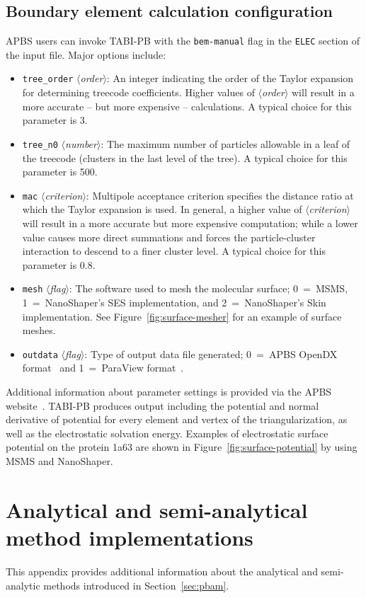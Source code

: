 \documentclass[12pt,titlepage]{article}
\newcommand{\keyword}[1]{\texttt{#1}}
\newcommand{\param}[1]{$\langle$\textit{#1}$\rangle$}
\begin{document}
\subsection{Boundary element calculation configuration}
APBS users can invoke TABI-PB with the \keyword{bem-manual} flag in the \keyword{ELEC} section of the input file.
Major options include:
\begin{itemize}
	\item \keyword{tree\_order} \param{order}:  An integer indicating the order of the Taylor expansion for determining treecode coefficients.
	Higher values of \param{order} will result in a more accurate -- but more expensive --  calculations.
	A typical choice for this parameter is 3.
	\item \keyword{tree\_n0} \param{number}:  The maximum number of particles allowable in a leaf of the treecode (clusters in the last level of the tree).
	A typical choice for this parameter is 500.
	\item \keyword{mac} \param{criterion}:  Multipole acceptance criterion specifies the distance ratio at which the Taylor expansion is used.
	In general, a higher value of \param{criterion} will result in a more accurate but more expensive computation; while a lower value causes more direct summations and forces the particle-cluster interaction to descend to a finer cluster level. 
	A typical choice for this parameter is 0.8.
	\item \keyword{mesh} \param{flag}:  The software used to mesh the molecular surface; 0~=~MSMS, 1~=~Nano\-Shaper's SES implementation, and 2~=~NanoShaper's Skin implementation.
	See Figure~\ref{fig:surface-mesher} for an example of surface meshes.
	\item \keyword{outdata} \param{flag}: Type of output data file generated; 0~=~APBS OpenDX format~\cite{OpenDX} and 1~=~ParaView format~\cite{ParaView}.
\end{itemize}
Additional information about parameter settings is provided via the APBS website~\cite{APBSweb}. 
TABI-PB produces output including the potential and normal derivative of potential for every element and vertex of the triangularization, as well as the electrostatic solvation energy.
Examples of electrostatic surface potential on the protein 1a63 are shown in Figure~\ref{fig:surface-potential} by using MSMS and NanoShaper.

\section{Analytical and semi-analytical method implementations} \label{app:pbam}
This appendix provides additional information about the analytical and semi-analytic methods introduced in Section~\ref{sec:pbam}.
\end{document}
